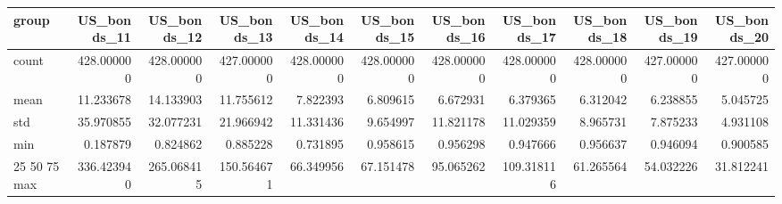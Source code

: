 \begin{tabular}{lrrrrrrrrrr}
\toprule
group & US_bonds_11 & US_bonds_12 & US_bonds_13 & US_bonds_14 & US_bonds_15 & US_bonds_16 & US_bonds_17 & US_bonds_18 & US_bonds_19 & US_bonds_20 \\
\midrule
count & 428.000000 & 428.000000 & 427.000000 & 428.000000 & 428.000000 & 428.000000 & 428.000000 & 428.000000 & 427.000000 & 427.000000 \\
mean & 11.233678 & 14.133903 & 11.755612 & 7.822393 & 6.809615 & 6.672931 & 6.379365 & 6.312042 & 6.238855 & 5.045725 \\
std & 35.970855 & 32.077231 & 21.966942 & 11.331436 & 9.654997 & 11.821178 & 11.029359 & 8.965731 & 7.875233 & 4.931108 \\
min & 0.187879 & 0.824862 & 0.885228 & 0.731895 & 0.958615 & 0.956298 & 0.947666 & 0.956637 & 0.946094 & 0.900585 \\
25%
50%
75%
max & 336.423940 & 265.068415 & 150.564671 & 66.349956 & 67.151478 & 95.065262 & 109.318116 & 61.265564 & 54.032226 & 31.812241 \\
\bottomrule
\end{tabular}
